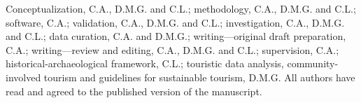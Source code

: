 \documentclass[sustainability,article,submit,pdftex,moreauthors]{Definitions/mdpi}
\begin{document}
%
%
%
%
%
%
%
%

\vspace{6pt} 



\authorcontributions 
{Conceptualization, C.A., D.M.G. and C.L.; methodology, C.A., D.M.G. and C.L.; software, C.A.; validation, C.A., D.M.G. and C.L.; investigation, C.A., D.M.G. and C.L.; data curation, C.A. and D.M.G.; writing---original draft preparation, C.A.; writing---review and editing, C.A., D.M.G. and C.L.; supervision, C.A.; historical-archaeological framework, C.L.; touristic data analysis, community-involved tourism and guidelines for sustainable tourism, D.M.G. All authors have read and agreed to the published version of the manuscript.}
\end{document}
